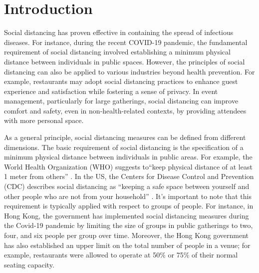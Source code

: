 




\section{Introduction}
Social distancing has proven effective in containing the spread of infectious diseases. For instance, during the recent COVID-19 pandemic, the fundamental requirement of social distancing involved establishing a minimum physical distance between individuals in public spaces. However, the principles of social distancing can also be applied to various industries beyond health prevention.
For example, restaurants may adopt social distancing practices to enhance guest experience and satisfaction while fostering a sense of privacy. In event management, particularly for large gatherings, social distancing can improve comfort and safety, even in non-health-related contexts, by providing attendees with more personal space.


As a general principle, social distancing measures can be defined from different dimensions. The basic requirement of social distancing is the specification of a minimum physical distance between individuals in public areas. For example, the World Health Organization (WHO) suggests to``keep physical distance of at least 1 meter from others'' \cite{AdviceforPublic}. In the US, the Centers for Disease Control and Prevention (CDC) describes social distancing as ``keeping a safe space between yourself and other people who are not from your household'' \cite{CDC}. 
It's important to note that this requirement is typically applied with respect to groups of people. For instance, in Hong Kong, the government has implemented social distancing measures during the Covid-19 pandemic by limiting the size of groups in public gatherings to two, four, and six people per group over time. Moreover, the Hong Kong government has also established an upper limit on the total number of people in a venue; for example, restaurants were allowed to operate at 50\% or 75\% of their normal seating capacity. 

